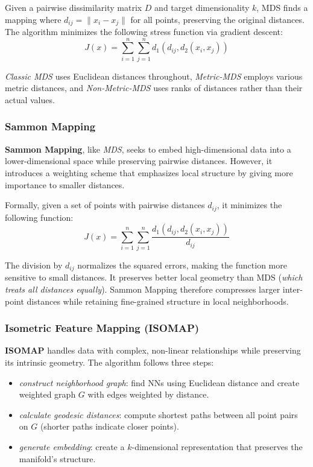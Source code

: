 Given a pairwise dissimilarity matrix $D$ and target dimensionality $k$, MDS finds a mapping where $d_{ij} = \|x_i - x_j\|$ for all points, preserving the original distances. The algorithm minimizes the following stress function via gradient descent:
\begin{equation}
    J(x) = \sum_{i=1}^n \sum_{j=1}^n d_1 (d_{ij}, d_2(x_i, x_j))
\end{equation}

\textit{Classic MDS} uses Euclidean distances throughout, \textit{Metric-MDS} employs various metric distances, and \textit{Non-Metric-MDS} uses ranks of distances rather than their actual values.

\subsubsection{Sammon Mapping}

\textbf{Sammon Mapping}, like \textit{MDS}, seeks to embed high-dimensional data into a lower-dimensional space while preserving pairwise distances. However, it introduces a weighting scheme that emphasizes local structure by giving more importance to smaller distances.

Formally, given a set of points with pairwise distances \( d_{ij} \), it minimizes the following function:
\begin{equation}
    J(x) = \sum_{i=1}^n \sum_{j=1}^n \frac{d_1(d_{ij},d_2(x_i,x_j))}{d_{ij}}
\end{equation}

The division by \( d_{ij} \) normalizes the squared errors, making the function more sensitive to small distances. It preserves better local geometry than MDS (\textit{which treats all distances equally}). Sammon Mapping therefore compresses larger inter-point distances while retaining fine-grained structure in local neighborhoods.

\subsubsection{Isometric Feature Mapping (ISOMAP)}
\textbf{ISOMAP} handles data with complex, non-linear relationships while preserving its intrinsic geometry. The algorithm follows three steps:
\begin{itemize}
    \item [1.] \textit{construct neighborhood graph}: find NNs using Euclidean distance and create weighted graph $G$ with edges weighted by distance.
    
    \item [2.] \textit{calculate geodesic distances}: compute shortest paths between all point pairs on $G$ (shorter paths indicate closer points).
    
    \item [3.] \textit{generate embedding}: create a $k$-dimensional representation that preserves the manifold's structure.
\end{itemize}
